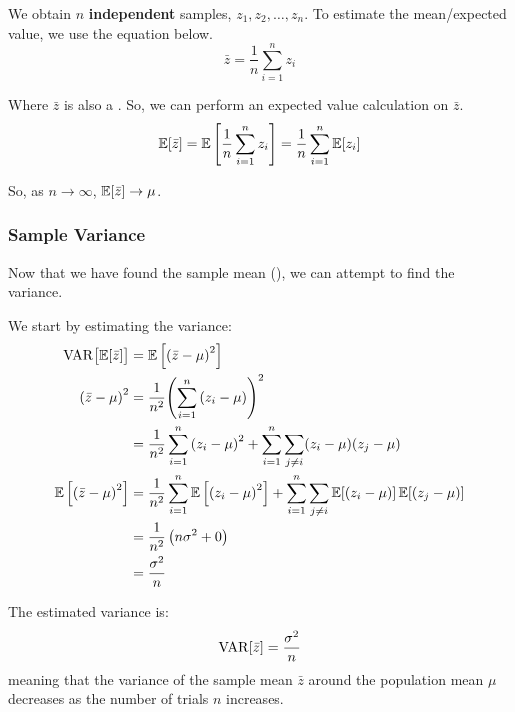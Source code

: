 We obtain $n$ \textbf{independent} samples, $z_{1}, z_{2}, \ldots, z_{n}$.
To estimate the mean/expected value, we use the equation below.
\begin{equation}\label{eq:Sample_Mean}
  \bar{z} = \frac{1}{n} \sum\limits_{i=1}^{n}z_{i}
\end{equation}

Where $\bar{z}$ is also a .
So, we can perform an expected value calculation on $\bar{z}$.
\begin{equation}\label{eq:Sample_Expected_Value}
  \operatorname{\operatorname{\mathbb{E}}}[\bar{z}] = \operatorname{\operatorname{\mathbb{E}}} \left[ \frac{1}{n} \sum\limits_{i=1}^{n} z_{i} \right] = \frac{1}{n} \sum\limits_{i=1}^{n} \operatorname{\operatorname{\mathbb{E}}}[z_{i}]
\end{equation}

So, as $n \rightarrow \infty$, $\operatorname{\operatorname{\mathbb{E}}}[\bar{z}] \rightarrow \mu$.

\subsubsection{Sample Variance}\label{subsubsec:sample_Variance}
Now that we have found the sample mean (), we can attempt to find the variance.

We start by estimating the variance:
\begin{align*}
  \operatorname{\operatorname{VAR}} \bigl[ \operatorname{\operatorname{\mathbb{E}}}[\bar{z}] \bigr] &= \operatorname{\operatorname{\mathbb{E}}} \left[ {(\bar{z} - \mu)}^{2} \right] \\
  {(\bar{z} - \mu)}^{2} &= \frac{1}{n^{2}} {\left( \sum\limits_{i=1}^{n} \left(z_{i} - \mu \right) \right)}^{2} \\
                                                  &= \frac{1}{n^{2}} \sum\limits_{i=1}^{n} {(z_{i} - \mu)}^{2} + \sum\limits_{i=1}^{n}\sum\limits_{j \neq i} (z_{i} - \mu) (z_{j} - \mu) \\
  \operatorname{\operatorname{\mathbb{E}}} \left[ {(\bar{z} - \mu)}^{2} \right] &= \frac{1}{n^{2}} \sum\limits_{i=1}^{n} \operatorname{\operatorname{\mathbb{E}}} \left[ {(z_{i} - \mu)}^{2} \right] + \sum\limits_{i=1}^{n}\sum\limits_{j \neq i} \operatorname{\operatorname{\mathbb{E}}}[(z_{i}-\mu)] \operatorname{\operatorname{\mathbb{E}}}[(z_{j} - \mu)] \\
                                                  &= \frac{1}{n^{2}} \left( n \sigma^{2} + 0 \right) \\
                                                  &= \frac{\sigma^{2}}{n}
\end{align*}

The estimated variance is:
\begin{equation*}
  \operatorname{\operatorname{VAR}}[\bar{z}] = \frac{\sigma^{2}}{n}  
\end{equation*}
meaning that the variance of the sample mean $\bar{z}$ around the population mean $\mu$ decreases as the number of trials $n$ increases.

